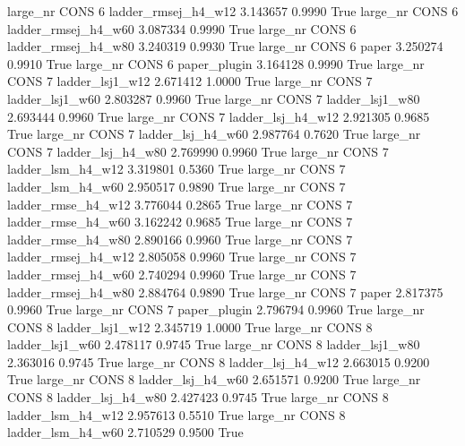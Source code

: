   large_nr     CONS                 6 ladder_rmsej_h4_w12    3.143657      0.9990    True
  large_nr     CONS                 6 ladder_rmsej_h4_w60    3.087334      0.9990    True
  large_nr     CONS                 6 ladder_rmsej_h4_w80    3.240319      0.9930    True
  large_nr     CONS                 6               paper    3.250274      0.9910    True
  large_nr     CONS                 6        paper_plugin    3.164128      0.9990    True
  large_nr     CONS                 7     ladder_lsj1_w12    2.671412      1.0000    True
  large_nr     CONS                 7     ladder_lsj1_w60    2.803287      0.9960    True
  large_nr     CONS                 7     ladder_lsj1_w80    2.693444      0.9960    True
  large_nr     CONS                 7   ladder_lsj_h4_w12    2.921305      0.9685    True
  large_nr     CONS                 7   ladder_lsj_h4_w60    2.987764      0.7620    True
  large_nr     CONS                 7   ladder_lsj_h4_w80    2.769990      0.9960    True
  large_nr     CONS                 7   ladder_lsm_h4_w12    3.319801      0.5360    True
  large_nr     CONS                 7   ladder_lsm_h4_w60    2.950517      0.9890    True
  large_nr     CONS                 7  ladder_rmse_h4_w12    3.776044      0.2865    True
  large_nr     CONS                 7  ladder_rmse_h4_w60    3.162242      0.9685    True
  large_nr     CONS                 7  ladder_rmse_h4_w80    2.890166      0.9960    True
  large_nr     CONS                 7 ladder_rmsej_h4_w12    2.805058      0.9960    True
  large_nr     CONS                 7 ladder_rmsej_h4_w60    2.740294      0.9960    True
  large_nr     CONS                 7 ladder_rmsej_h4_w80    2.884764      0.9890    True
  large_nr     CONS                 7               paper    2.817375      0.9960    True
  large_nr     CONS                 7        paper_plugin    2.796794      0.9960    True
  large_nr     CONS                 8     ladder_lsj1_w12    2.345719      1.0000    True
  large_nr     CONS                 8     ladder_lsj1_w60    2.478117      0.9745    True
  large_nr     CONS                 8     ladder_lsj1_w80    2.363016      0.9745    True
  large_nr     CONS                 8   ladder_lsj_h4_w12    2.663015      0.9200    True
  large_nr     CONS                 8   ladder_lsj_h4_w60    2.651571      0.9200    True
  large_nr     CONS                 8   ladder_lsj_h4_w80    2.427423      0.9745    True
  large_nr     CONS                 8   ladder_lsm_h4_w12    2.957613      0.5510    True
  large_nr     CONS                 8   ladder_lsm_h4_w60    2.710529      0.9500    True
